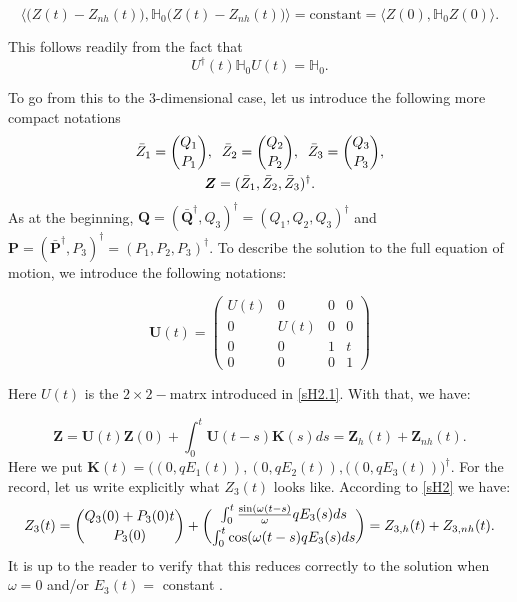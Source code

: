 \documentclass[12pt]{article}
\numberwithin{equation}{section}
\def\bK{{\boldsymbol K}}
\def\bZ{{\boldsymbol Z}}
\def\bP{{\boldsymbol P}}
\def\bQ{{\boldsymbol Q}}
\def\bU{{\boldsymbol U}}
\def\bZ{{\boldsymbol Z}}
\def\bbH{{\mathbb H}}
\begin{document}
$$\langle\big(Z(t)-Z_{nh}(t)\big),\bbH_0\big(Z(t)-Z_{nh}(t)\big)\rangle=\mbox{constant}=\langle Z(0),\bbH_0Z(0)\rangle.$$

This follows readily from the fact that 
\begin{equation}\label{inv1}
U^\dag(t)\bbH_0 U(t) = \bbH_0.
\end{equation}

To go from this to the 3-dimensional case, let us introduce the following more compact notations
\begin{gather}
\bar{Z}_1={Q_1\atopwithdelims ( ) P_1},\;\;\bar{Z}_2={Q_2\atopwithdelims ( ) P_2},\;\;\bar{Z}_3={Q_3\atopwithdelims ( ) P_3},\label{comp1}\\
\bZ = ( \bar{Z}_1, \bar{Z}_2, \bar{Z}_3)^\dag. \label{comp2}
\end{gather}
As at the beginning, $\bQ=(\bar{\bQ}^\dag,Q_3)^\dag=(Q_1,Q_2,Q_3)^\dag$ and $\bP=(\bar{\bP}^\dag,P_3)^\dag=(P_1,P_2,P_3)^\dag.$ To describe the solution to the full equation of motion, we introduce the following notations:

\begin{equation}
\bU(t)= \begin{pmatrix} U(t) &  0 & 0 & 0\\
					0 & U(t) & 0 & 0\\   
					0 &  0   & 1  & t\\
                                     0  &  0 &  0 & 1\end{pmatrix} 
\end{equation}

Here $U(t)$   is the $2\times2-$matrx introduced in \eqref{sH2.1}. With that, we have:

\begin{equation}\label{sH3}
\bZ = \bU(t)\bZ(0) + \int_0^t \bU(t-s)\bK(s)ds = \bZ_{h}(t)+\bZ_{nh}(t).
\end{equation}
Here we put $\bK(t) = \big((0,qE_1(t)), (0,qE_2(t)), ((0,qE_3(t))\big)^\dag.$ For the record, let us write explicitly what $Z_3(t)$ looks like. According to \eqref{sH2} we have:
\begin{equation}\label{sH4}
Z_3(t) = {Q_3(0)+P_3(0)t\atopwithdelims ( ) P_3(0)} + {\int_0^t\frac{\sin(\omega(t-s)}{\omega}qE_3(s)ds \atopwithdelims ( ) \int_0^t \cos(\omega(t-s) qE_3(s)ds} = Z_{3,h}(t) +Z_{3,nh}(t).
\end{equation}
It is up to the reader to verify that this reduces correctly to the solution when $\omega=0$ and/or $E_3(t)=$ constant .
                                   
\end{document}
